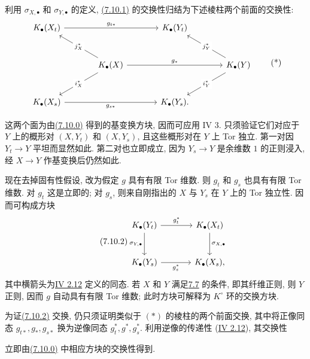 利用 $\sigma_{X,\bullet}$ 和 $\sigma_{Y,\bullet}$ 的定义, \hyperlink{sga6.e10.eq.7-10-1}{(7.10.1)} 的交换性归结为下述棱柱两个前面的交换性:
%
%
\[
\begin{tikzcd}[column sep=large,row sep=large]
K_\bullet(X_t) \arrow[rr,"g_{t*}"] && K_\bullet(Y_t)\\
& K_\bullet(X) \arrow[ul,"j_X^*" description]
  \arrow[dl,"i_X^*" description] \arrow[rr,"g_*"] &&
K_\bullet(Y) \arrow[ul,"j_Y^*" description]
  \arrow[dl,"i_Y^*" description]\\
K_\bullet(X_s) \arrow[rr,"g_{s*}"'] && K_\bullet(Y_s).
\end{tikzcd}
\tag{*}
\]

这两个面为由\hyperlink{sga6.e10.eq.7-10-0}{(7.10.0)} 得到的基变换方块, 因而可应用 IV 3. 只须验证它们对应于 $Y$ 上的概形对 $(X,Y_t)$ 和 $(X,Y_s)$, 且这些概形对在 $Y$ 上 Tor 独立. 第一对因 $Y_t\to Y$ 平坦而显然如此. 第二对也立即成立, 因为 $Y_s\to Y$ 是余维数 $1$ 的正则浸入, 经 $X\to Y$ 作基变换后仍然如此.
%
%
%
%
%
%

现在去掉固有性假设, 改为假定 $g$ 具有有限 Tor 维数. 则 $g_t$ 和 $g_s$ 也具有有限 Tor 维数. 对 $g_t$ 这是立即的; 对 $g_s$, 则来自刚指出的 $X$ 与 $Y_s$ 在 $Y$ 上的 Tor 独立性. 因而可构成方块
%
%
%
\begin{equation}\tag{7.10.2}
\begin{tikzcd}[column sep=large,row sep=large]
K_\bullet(Y_t) \arrow[r,"g_t^*"] \arrow[d,"\sigma_{Y,\bullet}"'] &
K_\bullet(X_t) \arrow[d,"\sigma_{X,\bullet}"]\\
K_\bullet(Y_s) \arrow[r,"g_s^*"'] & K_\bullet(X_s),
\end{tikzcd}
\end{equation}
其中横箭头为\hyperlink{sga6.e04.para.2-12}{IV 2.12} 定义的同态. 若 $X$ 和 $Y$ 满足\hyperlink{sga6.e10.sec.7.7}{7.7} 的条件, 即其纤维正则, 则 $Y$ 正则, 因而 $g$ 自动具有有限 Tor 维数; 此时方块可解释为 $K^\circ$ 环的交换方块.
%
%
%

为证\hyperlink{sga6.e10.eq.7-10-2}{(7.10.2)} 交换, 仍只须证明类似于 $(*)$ 的棱柱的两个前面交换, 其中将正像同态 $g_{t*},g_*,g_{s*}$ 换为逆像同态 $g_t^*,g^*,g_s^*$. 利用逆像的传递性 (\hyperlink{sga6.e04.para.2-12}{IV 2.12}), 其交换性
%
%
%

立即由\hyperlink{sga6.e10.eq.7-10-0}{(7.10.0)} 中相应方块的交换性得到.
%


